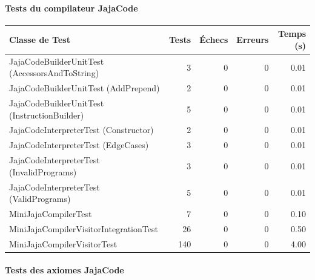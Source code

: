 \paragraph{Tests du compilateur JajaCode}

\begin{center}
\small
\begin{tabular}{|l|r|r|r|r|}
\hline
\rowcolor{headerblue!20}
\textbf{Classe de Test} & \textbf{Tests} & \textbf{Échecs} & \textbf{Erreurs} & \textbf{Temps (s)} \\
\hline
JajaCodeBuilderUnitTest (AccessorsAndToString) & 3 & 0 & 0 & 0.01 \\
\hline
JajaCodeBuilderUnitTest (AddPrepend) & 2 & 0 & 0 & 0.01 \\
\hline
JajaCodeBuilderUnitTest (InstructionBuilder) & 5 & 0 & 0 & 0.01 \\
\hline
JajaCodeInterpreterTest (Constructor) & 2 & 0 & 0 & 0.01 \\
\hline
JajaCodeInterpreterTest (EdgeCases) & 3 & 0 & 0 & 0.01 \\
\hline
JajaCodeInterpreterTest (InvalidPrograms) & 3 & 0 & 0 & 0.01 \\
\hline
JajaCodeInterpreterTest (ValidPrograms) & 5 & 0 & 0 & 0.01 \\
\hline
MiniJajaCompilerTest & 7 & 0 & 0 & 0.10 \\
\hline
MiniJajaCompilerVisitorIntegrationTest & 26 & 0 & 0 & 0.50 \\
\hline
\rowcolor{successgreen!20}
MiniJajaCompilerVisitorTest & 140 & 0 & 0 & 4.00 \\
\hline
\end{tabular}
\end{center}

\paragraph{Tests des axiomes JajaCode}

